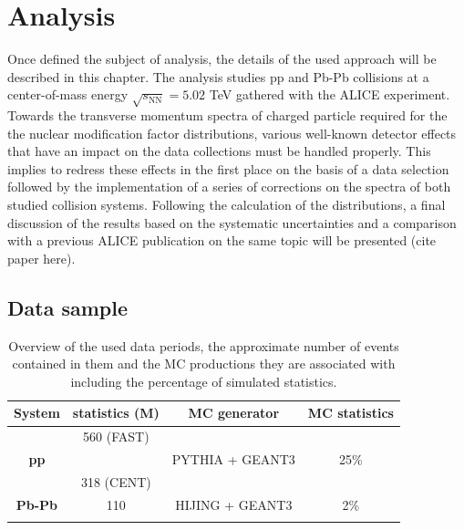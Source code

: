 \documentclass[12pt,a4paper]{report}
\begin{document}
\chapter{Analysis}
Once defined the subject of analysis, the details of the used approach will be described in this chapter. The analysis studies pp and Pb-Pb collisions at a center-of-mass energy $\sqrt{s_\text{NN}}= 5.02$ TeV gathered with the ALICE experiment. Towards the transverse momentum spectra of charged particle required for the the nuclear modification factor distributions, various well-known detector effects that have an impact on the data collections must be handled properly. This implies to redress these effects in the first place on the basis of a data selection followed by the implementation of a series of corrections on the  \pt spectra of both studied collision systems. Following the calculation of the \raa distributions, a final discussion of the results based on the systematic uncertainties and a comparison with a previous ALICE publication on the same topic will be presented (cite paper here).
\section{Data sample}
\begin{table}[H]
\centering
\renewcommand{\arraystretch}{1.5}
\begin{tabular}{c|c|c|c}
\toprule
\rowcolor{headerBlue} \textbf{System} & \textbf{statistics}  \textbf{(M)} & \textbf{MC generator} &  \textbf{MC statistics } \\
\midrule
             & 560 (FAST) & & \\
\textbf{pp}	 &	 &   PYTHIA + GEANT3  & 25\%  	 \\
 &  318 (CENT)   &  	\\
\hline
\textbf{Pb-Pb} & 110 &  HIJING + GEANT3  & 2\% \\
				 &	   & 		 \\
\bottomrule
\end{tabular}
\caption{Overview of the used data periods, the approximate number of events contained in them and the MC productions they are associated with including the percentage of simulated statistics.}
\label{tab:Periods}
\end{table} 
\end{document}
